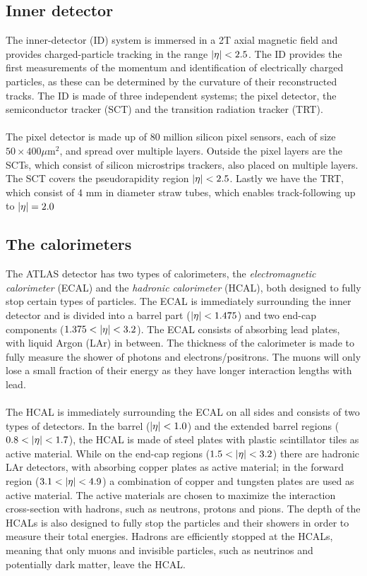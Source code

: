 \documentclass[12pt, a4paper]{book}
\begin{document}
\subsection{Inner detector}\label{sec:ID} 
The inner-detector (ID) system is immersed in a 2T axial magnetic field and provides charged-particle tracking in the range $\abs{\eta}<2.5$. The ID provides the first measurements of the 
momentum and identification of electrically charged particles, as these can be determined by the curvature of their reconstructed tracks. 
The ID is made of three independent systems; the pixel detector, the semiconductor tracker (SCT) and 
the transition radiation tracker (TRT). \\
\\The pixel detector is made up of 80 million silicon pixel sensors, each of size $50\times400\mu$m$^2$, %
and spread over multiple layers. Outside the pixel layers 
are the SCTs, which consist of silicon microstrips trackers, also placed on multiple layers. The SCT covers the pseudorapidity region $\abs{\eta}<2.5$. Lastly we have the TRT, 
which consist of 4 mm in diameter straw tubes, which enables track-following up to $\abs{\eta}=2.0$ 

\subsection{The calorimeters}\label{sec:calories}
The ATLAS detector has two types of calorimeters, the \textit{electromagnetic calorimeter} (ECAL) and the \textit{hadronic calorimeter} (HCAL), both designed to fully stop certain types of particles. 
The ECAL is immediately surrounding the inner detector and is divided into a barrel part ($\abs{\eta}<1.475$) and two end-cap components ($1.375<\abs{\eta}<3.2$). 
The ECAL consists of absorbing lead plates, with liquid Argon (LAr) in between. The thickness of the calorimeter is made to fully measure the shower of photons and electrons/positrons. The muons will only lose 
a small fraction of their energy as they have longer interaction lengths with lead.\\
\\The HCAL is immediately surrounding the ECAL on all sides and consists of two types of detectors. In the barrel ($\abs{\eta}<1.0$) and the extended barrel regions ($0.8<\abs{\eta}<1.7$), the HCAL is made of 
steel plates with plastic scintillator tiles as active material. While on the end-cap regions ($1.5<\abs{\eta}<3.2$) there are hadronic LAr detectors, with absorbing copper plates as active material; in the 
forward region ($3.1<\abs{\eta}<4.9$) a combination of copper and tungsten plates are used as active material. The active materials are chosen to maximize the interaction cross-section with hadrons, such as neutrons, 
protons and pions. The depth of the HCALs is also designed to fully stop the particles and their showers in order to measure their total energies. Hadrons are efficiently stopped at the HCALs, meaning that only 
muons and invisible particles, such as neutrinos and potentially dark matter, leave the HCAL.
\end{document}
